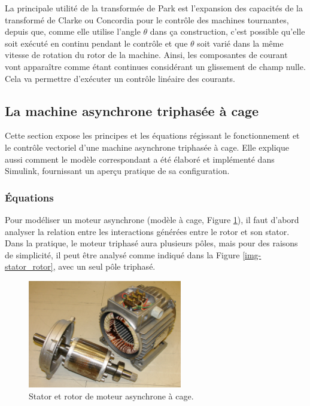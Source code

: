 La principale utilité de la transformée de Park est l'expansion des capacités de la transformé de Clarke ou Concordia pour le contrôle des machines tournantes, depuis que, comme elle utilise l'angle $\theta$ dans ça construction, c'est possible qu'elle soit exécuté en continu pendant le contrôle et que $\theta$ soit varié dans la même vitesse de rotation du rotor de la machine. Ainsi, les composantes de courant vont apparaître comme étant continues considérant un glissement de champ nulle. Cela va permettre d'exécuter un contrôle linéaire des courants. 




\FloatBarrier
\subsection{La machine asynchrone triphasée à cage}

Cette section expose les principes et les équations régissant le fonctionnement et le contrôle vectoriel d'une machine asynchrone triphasée à cage. Elle explique aussi comment le modèle correspondant a été élaboré et implémenté dans Simulink, fournissant un aperçu pratique de sa configuration.

\FloatBarrier
\subsubsection{Équations}

Pour modéliser un moteur asynchrone (modèle à cage, Figure \ref{img-zureks}), il faut d'abord analyser la relation entre les interactions générées entre le rotor et son stator. Dans la pratique, le moteur triphasé aura plusieurs pôles, mais pour des raisons de simplicité, il peut être analysé comme indiqué dans la Figure \ref{img-stator_rotor}, avec un seul pôle triphasé.

\begin{figure}[!h]
    \centering
    \includegraphics[width=0.6\textwidth]{imgs_pics/zureks.png} 
    \caption{Stator et rotor de moteur asynchrone à cage. \cite{Zureks}}
    \label{img-zureks}
\end{figure}

